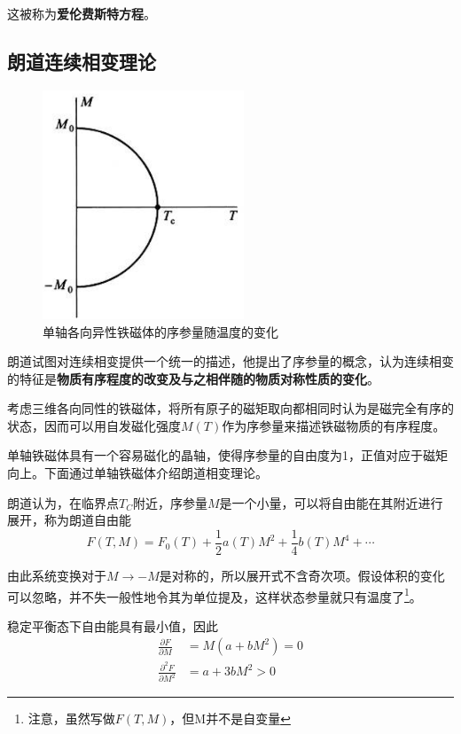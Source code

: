 \documentclass[UTF8]{ctexart}
\begin{document}
\noindent 这被称为\textbf{爱伦费斯特方程}。

	\subsection{朗道连续相变理论}
	
	\begin{figure}
		\includegraphics[width=6cm]{Ther_langdao.png}
		\caption{单轴各向异性铁磁体的序参量随温度的变化}
		\label{figure_6}
	\end{figure}

	朗道试图对连续相变提供一个统一的描述，他提出了序参量的概念，认为连续相变的特征是\textbf{物质有序程度的改变及与之相伴随的物质对称性质的变化}。
	
	考虑三维各向同性的铁磁体，将所有原子的磁矩取向都相同时认为是磁完全有序的状态，因而可以用自发磁化强度$ M(T) $作为序参量来描述铁磁物质的有序程度。

	单轴铁磁体具有一个容易磁化的晶轴，使得序参量的自由度为1，正值对应于磁矩向上。下面通过单轴铁磁体介绍朗道相变理论。
	
	朗道认为，在临界点$ T_{C} $附近，序参量$ M $是一个小量，可以将自由能在其附近进行展开，称为朗道自由能
	\begin{equation}
	F(T, M)=F_{0}(T)+\frac{1}{2} a(T) M^{2}+\frac{1}{4} b(T) M^{4}+\cdots
	\end{equation}
	
\noindent 由此系统变换对于$ M \rightarrow - M $是对称的，所以展开式不含奇次项。假设体积的变化可以忽略，并不失一般性地令其为单位提及，这样状态参量就只有温度了\footnote{注意，虽然写做$ F(T,M) $，但M并不是自变量}。
	
	稳定平衡态下自由能具有最小值，因此
	\begin{equation}
	\begin{aligned}\frac{\partial F}{\partial M}&=M\left(a+b M^{2}\right)=0 
	\\
	 \frac{\partial^{2} F}{\partial M^{2}}&=a+3 b M^{2}>0\end{aligned}
	\end{equation}
	
\end{document}
